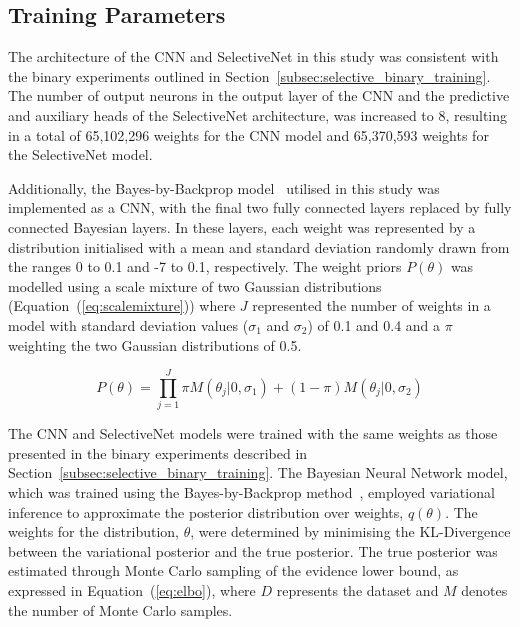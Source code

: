 \subsection{Training Parameters}
The architecture of the CNN and SelectiveNet in this study was consistent with the binary experiments outlined in Section~\ref{subsec:selective_binary_training}. The number of output neurons in the output layer of the CNN and the predictive and auxiliary heads of the SelectiveNet architecture, was increased to 8, resulting in a total of 65,102,296 weights for the CNN model and 65,370,593 weights for the SelectiveNet model.

Additionally, the Bayes-by-Backprop model~\citep{blundell2015weight} utilised in this study was implemented as a CNN, with the final two fully connected layers replaced by fully connected Bayesian layers. In these layers, each weight was represented by a distribution initialised with a mean and standard deviation randomly drawn from the ranges 0 to 0.1 and -7 to 0.1, respectively. The weight priors $P(\theta)$ was modelled using a scale mixture of two Gaussian distributions (Equation~(\ref{eq:scalemixture})) where $J$ represented the number of weights in a model with standard deviation values ($\sigma_1$ and $\sigma_2$) of 0.1 and 0.4 and a $\pi$ weighting the two Gaussian distributions of 0.5. 

\begin{equation}
	P(\theta) = \prod^J_{j=1}\pi M(\theta_j|0,\sigma_1)+(1-\pi)M(\theta_j|0,\sigma_2)
	\label{eq:scalemixture}
\end{equation}

The CNN and SelectiveNet models were trained with the same weights as those presented in the binary experiments described in Section~\ref{subsec:selective_binary_training}. The Bayesian Neural Network model, which was trained using the Bayes-by-Backprop method~\citep{blundell2015weight}, employed variational inference to approximate the posterior distribution over weights, $q(\theta)$. The weights for the distribution, $\theta$, were determined by minimising the KL-Divergence between the variational posterior and the true posterior. The true posterior was estimated through Monte Carlo sampling of the evidence lower bound, as expressed in Equation~(\ref{eq:elbo}), where $D$ represents the dataset and $M$ denotes the number of Monte Carlo samples.

